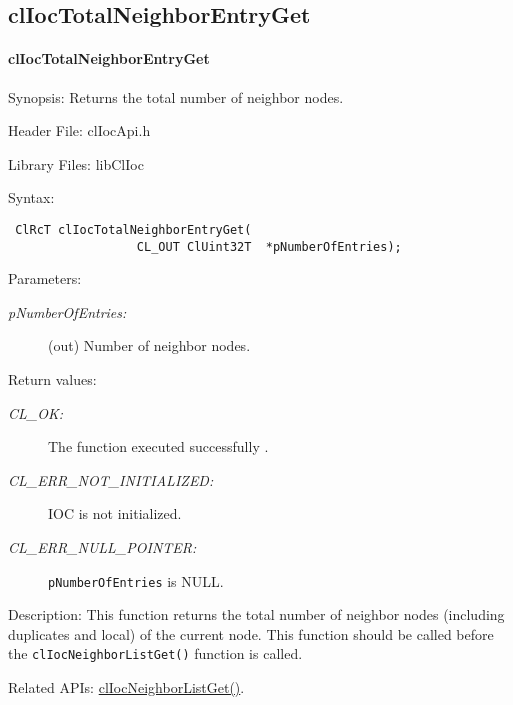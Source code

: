 \begin{flushleft}
\subsection{clIocTotalNeighborEntryGet}
\hypertarget{pageIOC122}{}\paragraph{cl\-Ioc\-Total\-Neighbor\-Entry\-Get}\label{pageIOC122}
\begin{Desc}
\item[Synopsis: ]Returns the total number of neighbor nodes.\end{Desc}
\begin{Desc}
\item[Header File:]clIocApi.h\end{Desc}
\begin{Desc}
\item[Library Files:]libClIoc\end{Desc}
\begin{Desc}
\item[Syntax: ]

\footnotesize\begin{verbatim} ClRcT clIocTotalNeighborEntryGet( 
                  CL_OUT ClUint32T  *pNumberOfEntries); 
\end{verbatim}
\normalsize
\end{Desc}
\begin{Desc}
\item[Parameters:]
\begin{description}
\item[{\em p\-Number\-Of\-Entries:}](out) Number of neighbor nodes.\end{description}
\end{Desc}
\begin{Desc}
\item[Return values:]
\begin{description}
\item[{\em CL\_\-OK:}]The function executed successfully . \item[{\em CL\_\-ERR\_\-NOT\_\-INITIALIZED:}] IOC is not initialized. 
\item[{\em CL\_\-ERR\_\-NULL\_\-POINTER:}]{\tt{p\-Number\-Of\-Entries}} is NULL.\end{description}
\end{Desc}
\begin{Desc}
\item[Description: ]This function returns the total number of neighbor nodes (including duplicates and local) of the current node. This function 
should be called before the {\tt{clIocNeighborListGet()}} function is called.\end{Desc}
\begin{Desc}
\item[Related APIs:]\hyperlink{pageIOC123}{clIocNeighborListGet()}. \end{Desc}


\end{flushleft}
